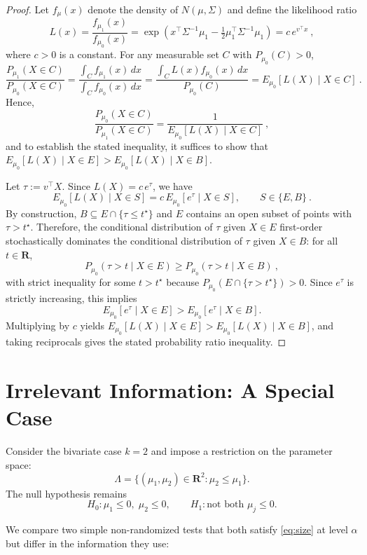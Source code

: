 \documentclass[12pt]{article}
\theoremstyle{definition}
\theoremstyle{remark}
\begin{document}
\begin{proof}
Let $f_\mu(x)$ denote the density of $N(\mu, \Sigma)$ and define the likelihood ratio
\[
L(x) = \frac{f_{\mu_1}(x)}{f_{\mu_0}(x)} 
= \exp\!\left(x^\top \Sigma^{-1}\mu_1 - \tfrac{1}{2}\mu_1^\top \Sigma^{-1}\mu_1\right)
= c\, e^{v^\top x}~,
\]
where $c>0$ is a constant. For any measurable set $C$ with $P_{\mu_0}(C) > 0$,
\[
\frac{P_{\mu_1}(X \in C)}{P_{\mu_0}(X \in C)} 
= \frac{\int_C f_{\mu_1}(x)\,dx}{\int_C f_{\mu_0}(x)\,dx}
= \frac{\int_C L(x) f_{\mu_0}(x)\,dx}{P_{\mu_0}(C)}
= E_{\mu_0}[L(X) \mid X \in C]~.
\]
Hence,
\[
\frac{P_{\mu_0}(X \in C)}{P_{\mu_1}(X \in C)} 
= \frac{1}{E_{\mu_0}[L(X) \mid X \in C]}~,
\]
and to establish the stated inequality, it suffices to show that 
$E_{\mu_0}[L(X) \mid X \in E] > E_{\mu_0}[L(X) \mid X \in B]$.

Let $\tau:=v^\top X$. Since $L(X)=c\,e^{\tau}$, we have
\[
E_{\mu_0}[L(X)\mid X\in S]=c\,E_{\mu_0}[e^{\tau}\mid X\in S],\qquad S\in\{E,B\}~.
\]
By construction, $B\subseteq E\cap\{\tau\le t^\star\}$ and $E$ contains an open subset of points with $\tau>t^\star$. Therefore, the conditional distribution of $\tau$ given $X\in E$ first-order stochastically dominates the conditional distribution of $\tau$ given $X\in B$:
for all $t \in\mathbf{R}$,
\[
P_{\mu_0}(\tau>t\mid X\in E) \ge P_{\mu_0}(\tau>t\mid X\in B)~,
\]
with strict inequality for some $t>t^\star$ because $P_{\mu_0}(E\cap\{\tau >t^\star\})>0$. Since $e^{\tau}$ is strictly increasing, this implies
\[
E_{\mu_0}[e^{\tau}\mid X\in E] > E_{\mu_0}[e^{\tau}\mid X\in B].
\]
Multiplying by $c$ yields $E_{\mu_0}[L(X)\mid X\in E]>E_{\mu_0}[L(X)\mid X\in B]$, and taking reciprocals gives the stated probability ratio inequality.
\end{proof}




\newpage 
\section*{Irrelevant Information: A Special Case}

Consider the bivariate case $k = 2$ and impose a restriction on the parameter space:
\[
\Lambda = \{ (\mu_1, \mu_2) \in \mathbf{R}^2 : \mu_2 \le \mu_1 \}.
\]
The null hypothesis remains
\[
H_0 : \mu_1 \le 0, \; \mu_2 \le 0, \qquad H_1 : \text{not both } \mu_j \le 0.
\]

We compare two simple non-randomized tests that both satisfy \eqref{eq:size} at level $\alpha$ but differ in the information they use:
\end{document}
